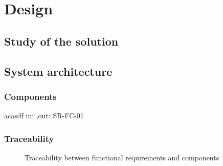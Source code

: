 \chapter{Design}\label{chap:design}



\section{Study of the solution}\label{sec:study}








\section{System architecture}\label{sec:architecture}

\subsection{Components}


\begin{component}{acasdf}
  {}  %
  {}  %
  {}  %
  {in: ,out: }  %
  {SR-FC-01}  %
\end{component}

\FloatBarrier  %







\subsection{Traceability}\label{subsec:comp-traceability}

\begin{figure}[h]
  \label{tab:traceability-comp-fc}
  \centering
  \caption{Traceability between functional requirements and components}
\end{figure}